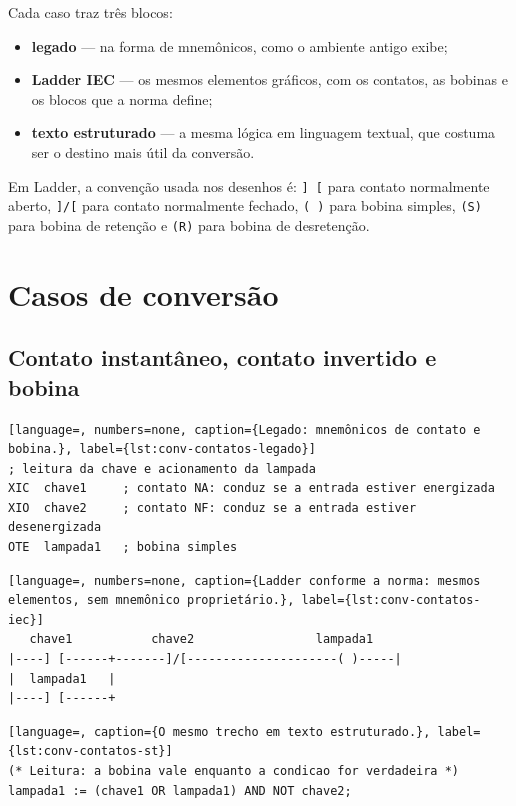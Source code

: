 Cada caso traz três blocos:

\begin{itemize}
  \item \textbf{legado} --- na forma de mnemônicos, como o ambiente antigo exibe;
  \item \textbf{Ladder IEC} --- os mesmos elementos gráficos, com os contatos, as bobinas e os blocos
        que a norma define;
  \item \textbf{texto estruturado} --- a mesma lógica em linguagem textual, que costuma ser o destino
        mais útil da conversão.
\end{itemize}

Em Ladder, a convenção usada nos desenhos é: \texttt{] [} para contato normalmente aberto,
\texttt{]/[} para contato normalmente fechado, \texttt{( )} para bobina simples, \texttt{(S)} para
bobina de retenção e \texttt{(R)} para bobina de desretenção.

\section{Casos de conversão}

\subsection{Contato instantâneo, contato invertido e bobina}

\begin{lstlisting}[language=, numbers=none, caption={Legado: mnemônicos de contato e bobina.}, label={lst:conv-contatos-legado}]
; leitura da chave e acionamento da lampada
XIC  chave1     ; contato NA: conduz se a entrada estiver energizada
XIO  chave2     ; contato NF: conduz se a entrada estiver desenergizada
OTE  lampada1   ; bobina simples
\end{lstlisting}

\begin{lstlisting}[language=, numbers=none, caption={Ladder conforme a norma: mesmos elementos, sem mnemônico proprietário.}, label={lst:conv-contatos-iec}]
   chave1           chave2                 lampada1
|----] [------+-------]/[---------------------( )-----|
|  lampada1   |
|----] [------+
\end{lstlisting}

\begin{lstlisting}[language=, caption={O mesmo trecho em texto estruturado.}, label={lst:conv-contatos-st}]
(* Leitura: a bobina vale enquanto a condicao for verdadeira *)
lampada1 := (chave1 OR lampada1) AND NOT chave2;
\end{lstlisting}

